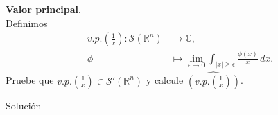 \begin{homeworkProblem}
  \textbf{Valor principal}.\\
  Definimos
  \begin{align*}
    v.p.\left( \frac{1}{x} \right):\mathcal{S}(\mathbb{R}^{n})&\longrightarrow \mathbb{C},\\
    \phi&\longmapsto \lim_{\epsilon \to 0}\int_{|x|\geq \epsilon}\frac{\phi(x)}{x}\, dx.
  \end{align*}
  Pruebe que $v.p.\left( \frac{1}{x} \right)\in\mathcal{S}'(\mathbb{R}^{n})$ y calcule $\hat{\left( v.p.\left( \frac{1}{x} \right) \right)}$. 
  \begin{solution}
    Solución
  \end{solution}
\end{homeworkProblem}
